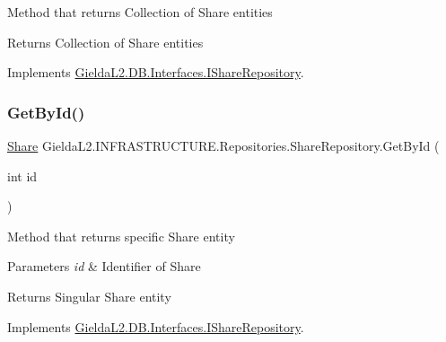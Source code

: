 Method that returns Collection of Share entities 

\begin{DoxyReturn}{Returns}
Collection of Share entities
\end{DoxyReturn}


Implements \mbox{\hyperlink{interface_gielda_l2_1_1_d_b_1_1_interfaces_1_1_i_share_repository_a5e13f8b06cb4711bb54137dabf783ed1}{Gielda\+L2.\+D\+B.\+Interfaces.\+I\+Share\+Repository}}.

\mbox{\label{class_gielda_l2_1_1_i_n_f_r_a_s_t_r_u_c_t_u_r_e_1_1_repositories_1_1_share_repository_ac034dd25c3630f8641baf9e7eafe94db}} 
\subsubsection{\texorpdfstring{GetById()}{GetById()}}
{\footnotesize\ttfamily \mbox{\hyperlink{class_gielda_l2_1_1_d_b_1_1_entities_1_1_share}{Share}} Gielda\+L2.\+I\+N\+F\+R\+A\+S\+T\+R\+U\+C\+T\+U\+R\+E.\+Repositories.\+Share\+Repository.\+Get\+By\+Id (\begin{DoxyParamCaption}\item[{int}]{id }\end{DoxyParamCaption})}



Method that returns specific Share entity 


\begin{DoxyParams}{Parameters}
{\em id} & Identifier of Share\\
\hline
\end{DoxyParams}
\begin{DoxyReturn}{Returns}
Singular Share entity
\end{DoxyReturn}


Implements \mbox{\hyperlink{interface_gielda_l2_1_1_d_b_1_1_interfaces_1_1_i_share_repository_af252fb27ec646e120265e2f71c83677a}{Gielda\+L2.\+D\+B.\+Interfaces.\+I\+Share\+Repository}}.

\mbox{\label{class_gielda_l2_1_1_i_n_f_r_a_s_t_r_u_c_t_u_r_e_1_1_repositories_1_1_share_repository_a76ee0cf8f78b19983167a3bcdff4e405}} 
